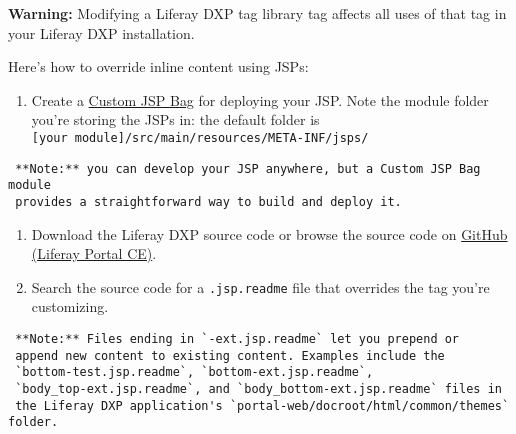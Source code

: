 \noindent\hrulefill

\noindent\hrulefill

\textbf{Warning:} Modifying a Liferay DXP tag library tag affects all
uses of that tag in your Liferay DXP installation.

\noindent\hrulefill

Here's how to override inline content using JSPs:

\begin{enumerate}
\def\labelenumi{\arabic{enumi}.}
\tightlist
\item
  Create a
  \href{/docs/7-2/customization/-/knowledge_base/c/jsp-overrides-using-custom-jsp-bag}{Custom
  JSP Bag} for deploying your JSP. Note the module folder you're storing
  the JSPs in: the default folder is
  \texttt{{[}your\ module{]}/src/main/resources/META-INF/jsps/}
\end{enumerate}

\noindent\hrulefill

\begin{verbatim}
 **Note:** you can develop your JSP anywhere, but a Custom JSP Bag module 
 provides a straightforward way to build and deploy it.
\end{verbatim}

\noindent\hrulefill

\begin{enumerate}
\def\labelenumi{\arabic{enumi}.}
\setcounter{enumi}{1}
\item
  Download the Liferay DXP source code or browse the source code on
  \href{https://github.com/liferay/liferay-portal/tree/7.2.x}{GitHub
  (Liferay Portal CE)}.
\item
  Search the source code for a \texttt{.jsp.readme} file that overrides
  the tag you're customizing.
\end{enumerate}

\noindent\hrulefill

\begin{verbatim}
 **Note:** Files ending in `-ext.jsp.readme` let you prepend or
 append new content to existing content. Examples include the
 `bottom-test.jsp.readme`, `bottom-ext.jsp.readme`,
 `body_top-ext.jsp.readme`, and `body_bottom-ext.jsp.readme` files in
 the Liferay DXP application's `portal-web/docroot/html/common/themes` folder.
\end{verbatim}

\noindent\hrulefill

